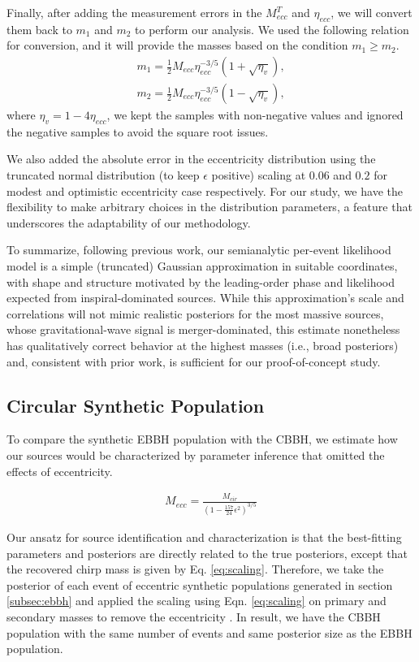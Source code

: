 \documentclass[twocolumn,prd,nofootinbib]{revtex4}
\newcommand\AddedResponse[1]{{\color{blue} {#1}}}
\begin{document}
\AddedResponse{
Finally, after adding the measurement errors in the $M_{ecc}^T$ and $\eta_{ecc}$, we will convert them back to $m_1$ and $m_2$ to perform our analysis. We used the following relation for conversion, and it will provide the masses 
based on the condition $m_1\geq m_2$.
%
\begin{align}
    m_1 = \frac{1}{2} M_{ecc} \eta_{ecc}^{-3/5} (1+\sqrt{\eta_v}), \\
    m_2 = \frac{1}{2} M_{ecc} \eta_{ecc}^{-3/5} (1-\sqrt{\eta_v}), 
\end{align}
where $\eta_v = 1-4\eta_{ecc}$, we kept the samples with non-negative values and ignored the negative samples to 
avoid the square root issues.
} 

We also added the absolute error in the eccentricity distribution using the truncated normal distribution 
(to keep $\epsilon$ positive) scaling at $0.06$ and $0.2$ for modest and optimistic eccentricity case respectively.
For our study, we have the flexibility to make arbitrary choices in the distribution parameters, a feature that underscores the adaptability of our methodology.

To summarize, following previous work, our semianalytic per-event likelihood model is a simple (truncated) Gaussian approximation
in suitable coordinates, with shape and structure motivated by the leading-order phase and likelihood expected from
inspiral-dominated sources.  While this approximation's scale and correlations will not mimic realistic posteriors for the most massive
sources, whose gravitational-wave signal is merger-dominated, this estimate nonetheless has qualitatively correct behavior at
the highest masses (i.e., broad posteriors) and, consistent with prior work, is sufficient for our proof-of-concept study.

\subsection{Circular Synthetic Population}

To compare the synthetic EBBH population with the CBBH, we estimate how our sources would be characterized by parameter inference that omitted the effects of eccentricity.


\begin{align}
\label{eq:scaling}
M_{ecc} = \frac{M_{cir}}{(1-\frac{157}{24}\epsilon^2)^{3/5}}
\end{align}


Our ansatz for source identification and characterization is that the best-fitting parameters and posteriors 
are directly related to the true posteriors, except that the recovered chirp mass is given by  
Eq. \ref{eq:scaling}. \AddedResponse{Therefore, we take the posterior of each event of eccentric synthetic populations generated in  section \ref{subsec:ebbh} and applied the scaling using Eqn. \ref{eq:scaling} on primary and secondary masses to remove the eccentricity  \cite{favata-scaling-2022}. In result, we have the CBBH population with the same number of events and same posterior size as the EBBH population.
}
\end{document}

